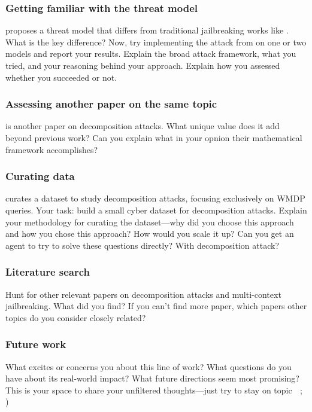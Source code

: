 \documentclass[11pt]{article}
\begin{document}
\subsubsection{Getting familiar with the threat model}
\cite{jones2024adversariesb} proposes a threat model that differs from traditional jailbreaking works like \cite{chao2024jailbreakinga}.
What is the key difference?
Now, try implementing the attack from \cite{jones2024adversariesb} on one or two models and report your results.
Explain the broad attack framework, what you tried, and your reasoning behind your approach. 
Explain how you assessed whether you succeeded or not.

\subsubsection{Assessing another paper on the same topic}
\cite{glukhov2024breach} is another paper on decomposition attacks.
What unique value does it add beyond previous work?
Can you explain what in your opnion their mathematical framework accomplishes?

\subsubsection{Curating data}
\cite{brown2025benchmarking} curates a dataset to study decomposition attacks, focusing exclusively on WMDP queries.
Your task: build a small cyber dataset for decomposition attacks.
Explain your methodology for curating the dataset---why did you choose this approach and how you chose this approach?
How would you scale it up?
Can you get an agent to try to solve these questions directly? With decomposition attack? 

\subsubsection{Literature search}
Hunt for other relevant papers on decomposition attacks and multi-context jailbreaking.
What did you find?
If you can't find more paper, which papers other topics do you consider closely related?


\subsubsection{Future work}
What excites or concerns you about this line of work?
What questions do you have about its real-world impact?
What future directions seem most promising?
This is your space to share your unfiltered thoughts---just try to stay on topic $\;$ ; )
\end{document}
